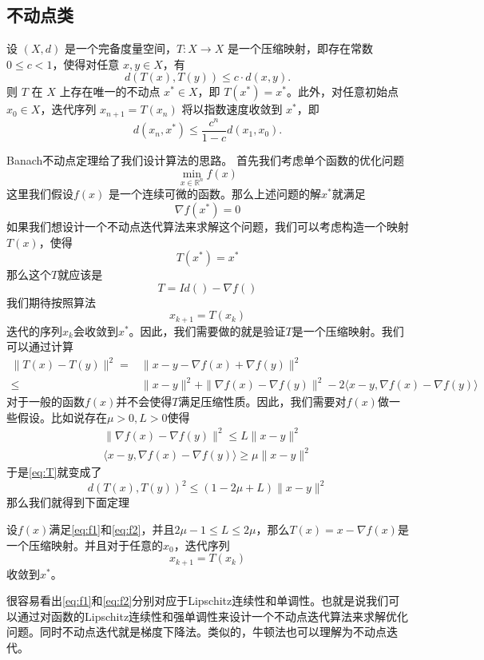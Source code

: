 \subsection{不动点类}
\begin{theorem}[Banach不动点定理] 设 $(X, d)$ 是一个完备度量空间，$T: X \to X$ 是一个压缩映射，即存在常数 $0 \leq c < 1$，使得对任意 $x, y \in X$，有
    \[
    d(T(x), T(y)) \leq c \cdot d(x, y).
    \]
    则 $T$ 在 $X$ 上存在唯一的不动点 $x^* \in X$，即 $T(x^*) = x^*$。此外，对任意初始点 $x_0 \in X$，迭代序列 $x_{n+1} = T(x_n)$ 将以指数速度收敛到 $x^*$，即
    \[
    d(x_n, x^*) \leq \frac{c^n}{1-c} d(x_1, x_0).
    \]
\end{theorem}
Banach不动点定理给了我们设计算法的思路。 首先我们考虑单个函数的优化问题
\[
\min_{x \in \mathbb{R}^n} f(x)
\]
这里我们假设$f(x)$ 是一个连续可微的函数。那么上述问题的解$x^*$就满足
\[
\nabla f(x^*) = 0
\]
如果我们想设计一个不动点迭代算法来求解这个问题，我们可以考虑构造一个映射$T(x)$，使得
\[
T(x^*) = x^*
\]
那么这个$T$就应该是
\[
T = Id()-\nabla f()\]
我们期待按照算法$$x_{k+1} = T(x_k)$$迭代的序列$x_k$会收敛到$x^*$。因此，我们需要做的就是验证$T$是一个压缩映射。我们可以通过计算
\begin{equation}\label{eq:T}
    \begin{aligned}
     \|T(x) - T(y)\|^2 
        = &\|x - y - \nabla f(x) + \nabla f(y)\|^2 \\
        \leq& \|x - y\|^2 + \| \nabla f(x) - \nabla f(y)\|^2-2\langle x - y, \nabla f(x) - \nabla f(y)\rangle
    \end{aligned}
\end{equation}
对于一般的函数$f(x)$并不会使得$ T$满足压缩性质。因此，我们需要对$f(x)$做一些假设。比如说存在$\mu>0, L>0$使得
\begin{align}
    \| \nabla f(x) - \nabla f(y)\|^2 \leq L\|x - y\|^2\label{eq:f1}\\
    \langle x - y, \nabla f(x) - \nabla f(y)\rangle \geq \mu\|x - y\|^2\label{eq:f2}
\end{align}
于是\eqref{eq:T}就变成了
\begin{equation}
    d(T(x), T(y))^2 \leq (1 - 2\mu + L)\|x - y\|^2
\end{equation}
那么我们就得到下面定理
\begin{theorem}
设$f(x)$满足\eqref{eq:f1}和\eqref{eq:f2}，并且$2\mu-1\leq L\leq 2\mu$，那么$T(x)=x-\nabla f(x)$是一个压缩映射。并且对于任意的$x_0$，迭代序列
\[x_{k+1} = T(x_k)\]收敛到$x^*$。
\end{theorem}
\begin{remark}
    很容易看出\eqref{eq:f1}和\eqref{eq:f2}分别对应于Lipschitz连续性和单调性。也就是说我们可以通过对函数的Lipschitz连续性和强单调性来设计一个不动点迭代算法来求解优化问题。同时不动点迭代就是梯度下降法。类似的，牛顿法也可以理解为不动点迭代。
\end{remark}
